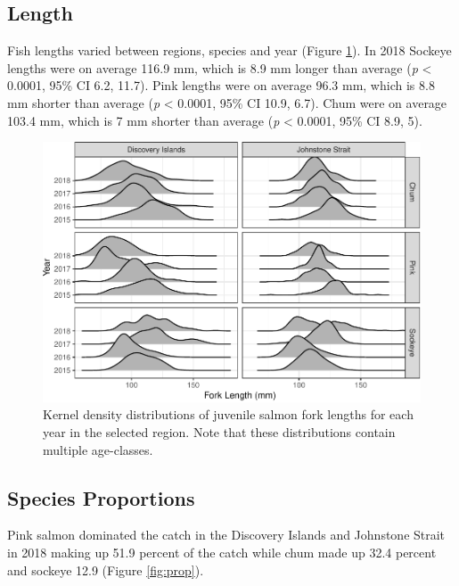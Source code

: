 \documentclass[fleqn,10pt]{wlpeerj} %
\begin{document}
\subsection*{Length}\label{length}

Fish lengths varied between regions, species and year (Figure
\ref{fig:length}). In 2018 Sockeye lengths were on average 116.9 mm,
which is 8.9 mm longer than average (\emph{p} \textless{} 0.0001, 95\%
CI 6.2, 11.7). Pink lengths were on average 96.3 mm, which is 8.8 mm
shorter than average (\emph{p} \textless{} 0.0001, 95\% CI 10.9, 6.7).
Chum were on average 103.4 mm, which is 7 mm shorter than average
(\emph{p} \textless{} 0.0001, 95\% CI 8.9, 5).

\begin{figure}[H]
\includegraphics[width=0.8\linewidth]{peer_j_migration_dynamics_files/figure-latex/length-1} \caption{Kernel density distributions of juvenile salmon fork lengths for each year in the selected region. Note that these distributions contain multiple age-classes.}\label{fig:length}
\end{figure}

\subsection*{Species Proportions}\label{species-proportions}

Pink salmon dominated the catch in the Discovery Islands and Johnstone
Strait in 2018 making up 51.9 percent of the catch while chum made up
32.4 percent and sockeye 12.9 (Figure \ref{fig:prop}).
\end{document}
